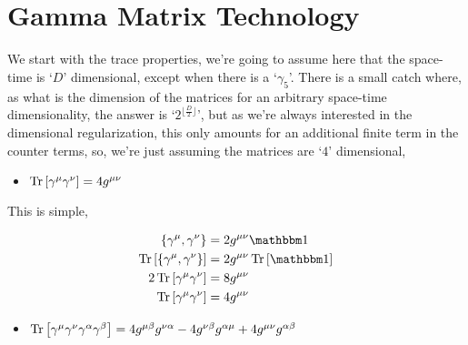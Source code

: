 \section{Gamma Matrix Technology}

We start with the trace properties, we're going to assume here that the space-time is `$D$' 
dimensional, except when there is a `$\gamma_5$'. There is a small catch where, as what 
is the dimension of the matrices for an arbitrary space-time dimensionality, the answer is 
`$2^{\lfloor \frac D2\rfloor}$', but as we're always interested in the dimensional regularization, 
this only amounts for an additional finite term in the counter terms, so, we're just assuming 
the matrices are `$4$' dimensional,

\begin{itemize}
    \item $\Tr\qty[\gamma^\mu \gamma^\nu]=4g^{\mu\nu}$
\end{itemize}

This is simple,

\begin{align}
    \acomm{\gamma^\mu}{\gamma^\nu}&=2g^{\mu\nu}\mathbbm 1\nonumber\\
    \Tr\qty[\acomm{\gamma^\mu}{\gamma^\nu}]&=2g^{\mu\nu}\Tr\qty[\mathbbm 1]\nonumber\\
    2\Tr\qty[\gamma^\mu\gamma^\nu]&=8g^{\mu\nu}\nonumber\\
    \Tr\qty[\gamma^\mu\gamma^\nu]&=4g^{\mu\nu}\nonumber
\end{align}

\begin{itemize}
    \item $\Tr\qty[\gamma^\mu \gamma^\nu\gamma^{\alpha}\gamma^{\beta}]=4g^{\mu\beta}g^{\nu\alpha}-4g^{\nu\beta}g^{\alpha\mu}+4g^{\mu\nu}g^{\alpha\beta}$
\end{itemize}

